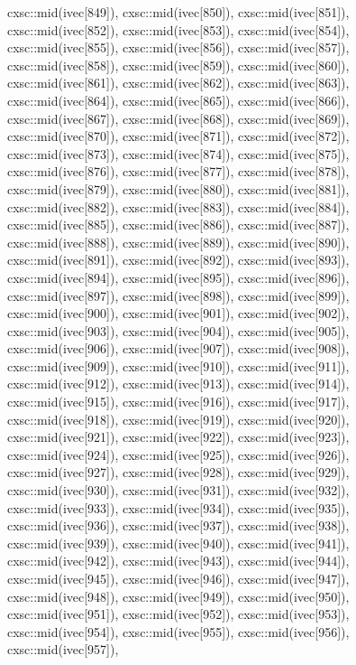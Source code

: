 \begin{DoxyCode}
{  cxsc::mid(ivec[849]),
  cxsc::mid(ivec[850]),
  cxsc::mid(ivec[851]),
  cxsc::mid(ivec[852]),
  cxsc::mid(ivec[853]),
  cxsc::mid(ivec[854]),
  cxsc::mid(ivec[855]),
  cxsc::mid(ivec[856]),
  cxsc::mid(ivec[857]),
  cxsc::mid(ivec[858]),
  cxsc::mid(ivec[859]),
  cxsc::mid(ivec[860]),
  cxsc::mid(ivec[861]),
  cxsc::mid(ivec[862]),
  cxsc::mid(ivec[863]),
  cxsc::mid(ivec[864]),
  cxsc::mid(ivec[865]),
  cxsc::mid(ivec[866]),
  cxsc::mid(ivec[867]),
  cxsc::mid(ivec[868]),
  cxsc::mid(ivec[869]),
  cxsc::mid(ivec[870]),
  cxsc::mid(ivec[871]),
  cxsc::mid(ivec[872]),
  cxsc::mid(ivec[873]),
  cxsc::mid(ivec[874]),
  cxsc::mid(ivec[875]),
  cxsc::mid(ivec[876]),
  cxsc::mid(ivec[877]),
  cxsc::mid(ivec[878]),
  cxsc::mid(ivec[879]),
  cxsc::mid(ivec[880]),
  cxsc::mid(ivec[881]),
  cxsc::mid(ivec[882]),
  cxsc::mid(ivec[883]),
  cxsc::mid(ivec[884]),
  cxsc::mid(ivec[885]),
  cxsc::mid(ivec[886]),
  cxsc::mid(ivec[887]),
  cxsc::mid(ivec[888]),
  cxsc::mid(ivec[889]),
  cxsc::mid(ivec[890]),
  cxsc::mid(ivec[891]),
  cxsc::mid(ivec[892]),
  cxsc::mid(ivec[893]),
  cxsc::mid(ivec[894]),
  cxsc::mid(ivec[895]),
  cxsc::mid(ivec[896]),
  cxsc::mid(ivec[897]),
  cxsc::mid(ivec[898]),
  cxsc::mid(ivec[899]),
  cxsc::mid(ivec[900]),
  cxsc::mid(ivec[901]),
  cxsc::mid(ivec[902]),
  cxsc::mid(ivec[903]),
  cxsc::mid(ivec[904]),
  cxsc::mid(ivec[905]),
  cxsc::mid(ivec[906]),
  cxsc::mid(ivec[907]),
  cxsc::mid(ivec[908]),
  cxsc::mid(ivec[909]),
  cxsc::mid(ivec[910]),
  cxsc::mid(ivec[911]),
  cxsc::mid(ivec[912]),
  cxsc::mid(ivec[913]),
  cxsc::mid(ivec[914]),
  cxsc::mid(ivec[915]),
  cxsc::mid(ivec[916]),
  cxsc::mid(ivec[917]),
  cxsc::mid(ivec[918]),
  cxsc::mid(ivec[919]),
  cxsc::mid(ivec[920]),
  cxsc::mid(ivec[921]),
  cxsc::mid(ivec[922]),
  cxsc::mid(ivec[923]),
  cxsc::mid(ivec[924]),
  cxsc::mid(ivec[925]),
  cxsc::mid(ivec[926]),
  cxsc::mid(ivec[927]),
  cxsc::mid(ivec[928]),
  cxsc::mid(ivec[929]),
  cxsc::mid(ivec[930]),
  cxsc::mid(ivec[931]),
  cxsc::mid(ivec[932]),
  cxsc::mid(ivec[933]),
  cxsc::mid(ivec[934]),
  cxsc::mid(ivec[935]),
  cxsc::mid(ivec[936]),
  cxsc::mid(ivec[937]),
  cxsc::mid(ivec[938]),
  cxsc::mid(ivec[939]),
  cxsc::mid(ivec[940]),
  cxsc::mid(ivec[941]),
  cxsc::mid(ivec[942]),
  cxsc::mid(ivec[943]),
  cxsc::mid(ivec[944]),
  cxsc::mid(ivec[945]),
  cxsc::mid(ivec[946]),
  cxsc::mid(ivec[947]),
  cxsc::mid(ivec[948]),
  cxsc::mid(ivec[949]),
  cxsc::mid(ivec[950]),
  cxsc::mid(ivec[951]),
  cxsc::mid(ivec[952]),
  cxsc::mid(ivec[953]),
  cxsc::mid(ivec[954]),
  cxsc::mid(ivec[955]),
  cxsc::mid(ivec[956]),
  cxsc::mid(ivec[957]),
}
\end{DoxyCode}
